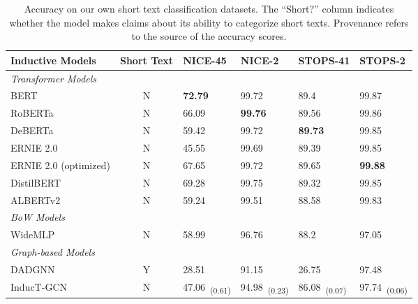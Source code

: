 \documentclass[runningheads]{llncs}
\begin{document}
\begin{table*}[!ht]
   \small
    \caption[Accuracy on our own short text classification datasets]{
    \centering
    Accuracy on our own short text classification datasets. The ``Short?'' column indicates whether the model makes claims about its ability to categorize short texts. Provenance refers to the source of the accuracy scores.
    }
    \label{tab:accuracy_own}
    \centering
    \begin{tabular}{lcllll}

        \toprule
        \textbf{Inductive Models} & \textbf{Short Text} & \textbf{NICE-45} & \textbf{NICE-2} & \textbf{STOPS-41} & \textbf{STOPS-2} \\
        \midrule
        \textit{Transformer Models} \\
        BERT                      & N                   & \textbf{72.79}   & 99.72           & 89.4              & 99.87            \\
        RoBERTa                   & N                   & 66.09            & \textbf{99.76}  & 89.56             & 99.86            \\
        DeBERTa                   & N                   & 59.42            & 99.72           & \textbf{89.73}    & 99.85            \\
        ERNIE 2.0                 & N                   & 45.55            & 99.69           & 89.39             & 99.85            \\
        ERNIE 2.0 (optimized)     & N                   & 67.65            & 99.72           & 89.65             & \textbf{99.88}   \\
        DistilBERT                & N                   & 69.28            & 99.75           & 89.32             & 99.85            \\
        ALBERTv2                  & N                   & 59.24            & 99.51           & 88.58             & 99.83            \\
        \midrule
        \textit{BoW Models} \\
        WideMLP                   & N                   & 58.99            & 96.76           & 88.2              & 97.05            \\
        \midrule
        \textit{Graph-based Models} \\
        DADGNN                    & Y                   & 28.51            & 91.15           & 26.75             & 97.48            \\ 
        InducT-GCN                & N                   & 47.06~\textsubscript{(0.61)}            & 94.98~\textsubscript{(0.23)}   & 86.08~\textsubscript{(0.07)}      & 97.74~\textsubscript{(0.06)}            \\

\end{tabular}
\end{table*}
\end{document}
